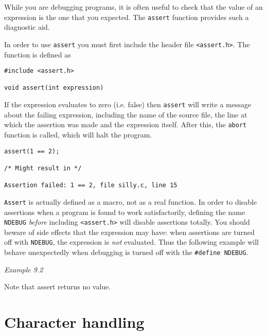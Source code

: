  

  While you are debugging programs, it is often useful to
   check that the value of an expression is the one that you
   expected. The \texttt{assert} function provides such a diagnostic
   aid.


  In order to use \texttt{assert} you must first include the header
   file \texttt{<assert.h>}.  The function is defined as


  \begin{Verbatim}
#include <assert.h>

void assert(int expression)
\end{Verbatim}

  If the expression  evaluates  to  zero  (i.e.   false)  then
   \texttt{assert}  will  write  a message about the failing expression,
   including the name of the source file, the line at which the
   assertion  was  made and the expression itself.  After this,
   the \texttt{abort} function is called, which will halt the program.


  \begin{Verbatim}
assert(1 == 2);

/* Might result in */

Assertion failed: 1 == 2, file silly.c, line 15
\end{Verbatim}

  \texttt{Assert} is actually  defined  as  a  macro,  not  as  a  real
   function.  In  order to disable assertions when a program is
   found to  work  satisfactorily,  defining  the  name  \texttt{NDEBUG}
   \textit{before} including \texttt{<assert.h>} will disable
   assertions totally.
   You should beware of side effects that  the  expression  may
   have:  when  assertions  are  turned  off  with  \texttt{NDEBUG}, the
   expression is \textit{not} evaluated. Thus the following example will
   behave  unexpectedly  when  debugging is turned off with the
   \texttt{\#define NDEBUG}.


  \begin{center}\textit{Example 9.2}\end{center}


  Note that assert returns no value.


 
        \section{Character handling}
        

